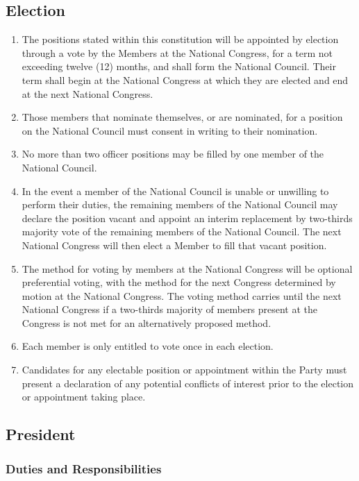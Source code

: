 \documentclass[a4paper,titlepage,8.5pt]{article}
\begin{document}
\subsection{Election}

\begin{enumerate}
\item The positions stated within this constitution will be appointed by election through a vote by the Members at the National Congress, for a term not exceeding twelve (12) months, and shall form the National Council. Their term shall begin at the National Congress at which they are elected and end at the next National Congress.
\item Those members that nominate themselves, or are nominated, for a position on the National Council must consent in writing to their nomination.
\item No more than two officer positions may be filled by one member of the National Council.
\item In the event a member of the National Council is unable or unwilling to perform their duties, the remaining members of the National Council may declare the position vacant and appoint an interim replacement by two-thirds majority vote of the remaining members of the National Council. The next National Congress will then elect a Member to fill that vacant position.
\item The method for voting by members at the National Congress will be optional preferential voting, with the method for the next Congress determined by motion at the National Congress. The voting method carries until the next National Congress if a two-thirds majority of members present at the Congress is not met for an alternatively proposed method.
\item Each member is only entitled to vote once in each election.
\item Candidates for any electable position or appointment within the Party must present a declaration of any potential conflicts of interest prior to the election or appointment taking place.
\end{enumerate}

\subsection{President}

\subsubsection{Duties and Responsibilities}
\end{document}
